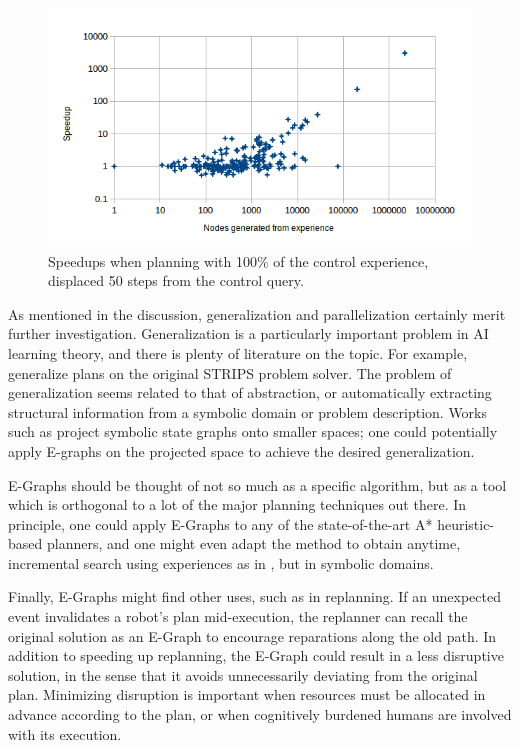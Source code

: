 \documentclass[letterpaper]{article}
\begin{document}
\begin{figure}
	\centering
	\includegraphics[scale=0.5]{Speedup_100_50.png}
	\caption{Speedups when planning with 100\% of the control experience, displaced 50 steps from the control query.}
	 \label{fig:s_100_50}
\end{figure}
As mentioned in the discussion, generalization and parallelization certainly merit further investigation. Generalization is a particularly important problem in AI learning theory, and there is plenty of literature on the topic. For example, \cite{fikes1972learning} generalize plans on the original STRIPS problem solver. The problem of generalization seems related to that of abstraction, or automatically extracting structural information from a symbolic domain or problem description. Works such as \cite{helmert2007flexible} project symbolic state graphs onto smaller spaces; one could potentially apply E-graphs on the projected space to achieve the desired generalization.

E-Graphs should be thought of not so much as a specific algorithm, but as a tool which is orthogonal to a lot of the major planning techniques out there. In principle, one could apply E-Graphs to any of the state-of-the-art A* heuristic-based planners, and one might even adapt the method to obtain anytime, incremental search using experiences as in \cite{phillips2013anytime}, but in symbolic domains.

Finally, E-Graphs might find other uses, such as in replanning. If an unexpected event invalidates a robot's plan mid-execution, the replanner can recall the original solution as an E-Graph to encourage reparations along the old path. In addition to speeding up replanning, the E-Graph could result in a less disruptive solution, in the sense that it avoids unnecessarily deviating from the original plan. Minimizing disruption is important when resources must be allocated in advance according to the plan, or when cognitively burdened humans are involved with its execution.



\end{document}
